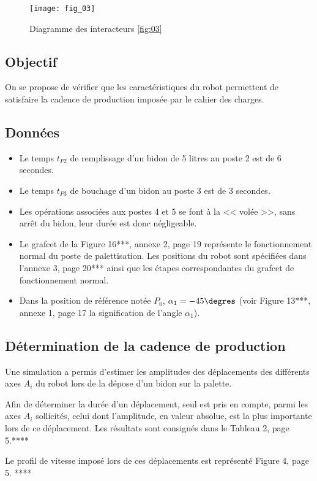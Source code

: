 \begin{figure}[H]
\centering
\texttt{[image: fig\_03]}
\caption{Diagramme des interacteurs \ref{fig:03}}
\end{figure}


\subsection{Objectif }
On se propose de vérifier que les caractéristiques du robot permettent de satisfaire la cadence 
de production imposée par le cahier des charges. 

\subsection{Données}
\begin{itemize}
\item Le temps $t_{P2}$ de remplissage d’un bidon de 5 litres au poste 2 est de 6 secondes. 
\item Le temps $t_{P3}$ de bouchage d’un bidon au poste 3 est de 3 secondes. 
\item Les opérations associées aux postes 4 et 5 se font à la << volée >>, sans arrêt du bidon,
leur durée est donc négligeable. 
\item Le grafcet de la Figure 16***, annexe 2, page 19 représente le fonctionnement normal du 
poste de palettisation. Les positions du robot sont spécifiées dans l’annexe 3, page 20***
ainsi que les étapes correspondantes du grafcet de fonctionnement normal. 
\item Dans la position de référence notée $P_0$, $\alpha_1 = -45\degres$ (voir Figure 13***, annexe 1, page 17 la signification de l’angle $\alpha_1$). 
\end{itemize}

\subsection{Détermination de la cadence de production}
Une simulation a permis d’estimer les amplitudes des déplacements des différents axes $A_i$ du robot lors de la dépose d’un bidon sur la palette. 

Afin de déterminer la durée d’un déplacement, seul est pris en compte, parmi les axes $A_i$ sollicités, celui dont l’amplitude, en valeur absolue, est la plus importante lors de ce déplacement. Les résultats sont consignés dans le Tableau 2, page 5.**** 

Le profil de vitesse imposé lors de ces déplacements est représenté Figure 4, page 5. ****

